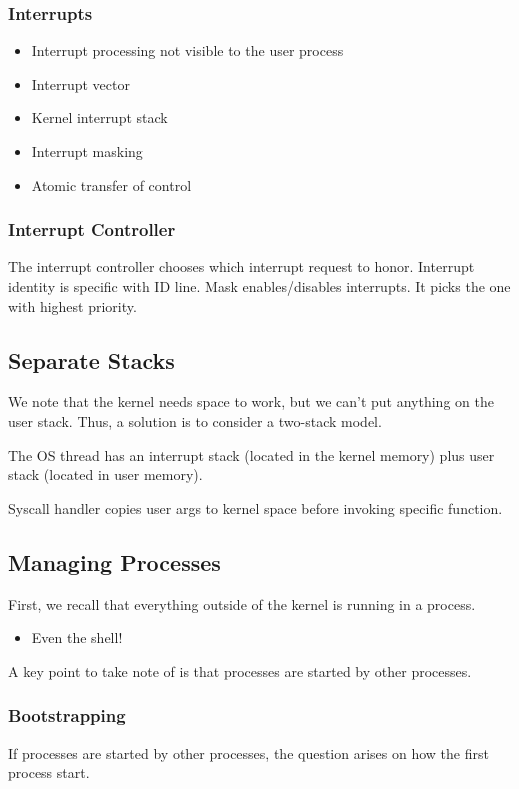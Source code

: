 \documentclass[openany]{book}
\begin{document}
\subsubsection{Interrupts}
\begin{itemize}
	\item Interrupt processing not visible to the user process
	\item Interrupt vector
	\item Kernel interrupt stack
	\item Interrupt masking
	\item Atomic transfer of control
\end{itemize}

\subsubsection{Interrupt Controller}
The interrupt controller chooses which interrupt request to honor. Interrupt identity is specific with ID line. Mask enables/disables interrupts. It picks the one with highest priority.

\subsection{Separate Stacks}
We note that the kernel needs space to work, but we can't put anything on the user stack. Thus, a solution is to consider a two-stack model.

The OS thread has an interrupt stack (located in the kernel memory) plus user stack (located in user memory).

Syscall handler copies user args to kernel space before invoking specific function.

\subsection{Managing Processes}
First, we recall that everything outside of the kernel is running in a process.
\begin{itemize}
	\item Even the shell!
\end{itemize}

A key point to take note of is that processes are started by other processes.

\subsubsection{Bootstrapping}
If processes are started by other processes, the question arises on how the first process start.
\end{document}
